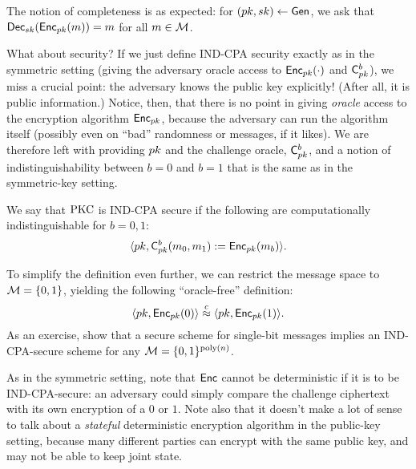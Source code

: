 \documentclass[11pt]{article}
\begin{document}
The notion of completeness is as expected: for $(pk, sk) \gets
\mathsf{Gen}$, we ask that $\mathsf{Dec}_{sk}(\mathsf{Enc}_{pk}(m)) = m$ for all $m
\in \mathcal{M}$.

What about security?  If we just define IND-CPA security exactly as in
the symmetric setting (giving the adversary oracle access to
$\mathsf{Enc}_{pk}(\cdot)$ and $\mathsf{C}_{pk}^{b}$), we miss a crucial
point: the adversary knows the public key explicitly!  (After all, it
is public information.)  Notice, then, that there is no point in
giving \emph{oracle} access to the encryption algorithm
$\mathsf{Enc}_{pk}$, because the adversary can run the algorithm itself
(possibly even on ``bad'' randomness or messages, if it likes).  We
are therefore left with providing $pk$ and the challenge oracle,
$\mathsf{C}_{pk}^{b}$, and a notion of indistinguishability between $b
= 0$ and $b = 1$ that is the same as in the symmetric-key setting.

\begin{definition}
  \label{def:ind-cpa-pkc}
  We say that $\text{PKC}$ is IND-CPA secure if the following are
  computationally indistinguishable for $b = 0,1$: \[ \langle pk,
  \mathsf{C}^{b}_{pk}(m_{0}, m_{1}) := \mathsf{Enc}_{pk}(m_{b})
  \rangle. \]
\end{definition}

To simplify the definition even further, we can restrict the message
space to $\mathcal{M} = \{0,1\}$, yielding the following ``oracle-free''
definition:
\[ \langle pk, \mathsf{Enc}_{pk}(0) \rangle \stackrel{c}{\approx} \langle pk,
\mathsf{Enc}_{pk}(1) \rangle. \] As an exercise, show that a secure scheme
for single-bit messages implies an IND-CPA-secure scheme for any
$\mathcal{M} = \{0,1\}^{\operatorname{poly}(n)}$.


As in the symmetric setting, note that $\mathsf{Enc}$ cannot be
deterministic if it is to be IND-CPA-secure: an adversary could simply
compare the challenge ciphertext with its own encryption of a $0$ or
$1$.  Note also that it doesn't make a lot of sense to talk about a
\emph{stateful} deterministic encryption algorithm in the public-key
setting, because many different parties can encrypt with the same
public key, and may not be able to keep joint state.
\end{document}
